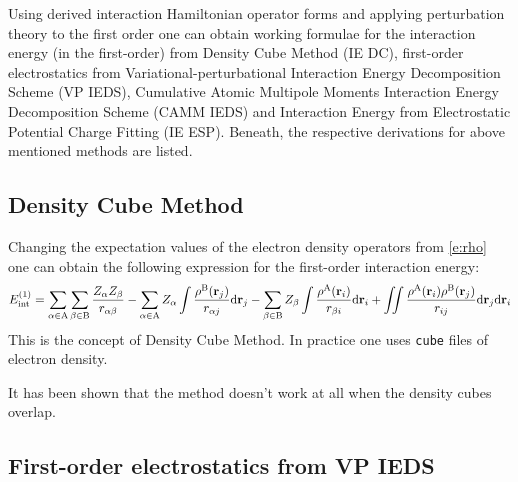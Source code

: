 \documentclass[a4paper,titlepage,twoside,fleqn]{article}
\newcommand{\VEC}[1]{\ensuremath{\mathrm{\mathbf{#1}}}}
\begin{document}
Using derived interaction Hamiltonian operator forms and applying
perturbation theory to the first order one can obtain working
formulae for the interaction energy (in the first-order) from 
Density Cube Method (IE DC), first-order electrostatics from 
Variational-perturbational Interaction Energy Decomposition 
Scheme (VP IEDS), Cumulative Atomic Multipole Moments Interaction 
Energy Decomposition Scheme (CAMM IEDS) and Interaction Energy 
from Electrostatic Potential Charge Fitting (IE ESP). Beneath, 
the respective derivations for above mentioned methods are listed.

\subsection{Density Cube Method}

Changing the expectation values of the electron density operators
from \ref{e:rho} one can obtain the following expression for the
first-order interaction energy:
\begin{equation}\label{e:DCM}
E_{\rm int}^{(1)}= \sum_{\alpha \in {\rm A}} \sum_{\beta \in {\rm B}} \frac{Z_{\alpha}Z_{\beta}}{r_{\alpha\beta}} \\
                 - \sum_{\alpha \in {\rm A}} Z_{\alpha} \int \frac{\rho^{\rm B}(\VEC{r}_j)}{r_{\alpha j}} {\rm d}\VEC{r}_j
                 - \sum_{\beta  \in {\rm B}} Z_{\beta}  \int \frac{\rho^{\rm A}(\VEC{r}_i)}{r_{\beta  i}} {\rm d}\VEC{r}_i \\
                 + \iint \frac{\rho^{\rm A}(\VEC{r}_i)\rho^{\rm B}(\VEC{r}_j)}{r_{ij}} {\rm d}\VEC{r}_j {\rm d}\VEC{r}_i
\end{equation} 
This is the concept of Density Cube Method. 
In practice one uses \verb+cube+ files of electron density.

It has been shown that the method doesn't work at all when 
the density cubes overlap. 

\subsection{First-order electrostatics from VP IEDS}
\end{document}
